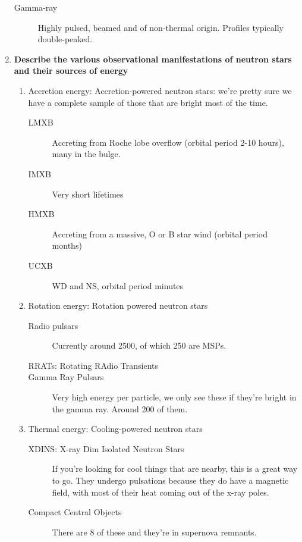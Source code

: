 \documentclass[a4paper]{article}
\begin{document}
\begin{enumerate}
\begin{description}
\item[Gamma-ray] Highly pulsed, beamed and of non-thermal origin. Profiles typically double-peaked. 

\end{description}

\item \textbf{Describe the various observational manifestations of neutron stars and their sources of energy}

\begin{enumerate}

\item Accretion energy: Accretion-powered neutron stars: we're pretty sure we have a complete sample of those that are bright most of the time. 
\begin{description}
\item[LMXB] Accreting from Roche lobe overflow (orbital period 2-10 hours), many in the bulge.
\item[IMXB] Very short lifetimes
\item[HMXB] Accreting from a massive, O or B star wind (orbital period months)
\item[UCXB] WD and NS, orbital period minutes
\end{description}

\item Rotation energy: Rotation powered neutron stars

\begin{description}
\item[Radio pulsars] Currently around 2500, of which 250 are MSPs. 
\item[RRATs: Rotating RAdio Transients] 
\item[Gamma Ray Pulsars] Very high energy per particle, we only see these if they're bright in the gamma ray. Around 200 of them. 
\end{description}

\item Thermal energy: Cooling-powered neutron stars

\begin{description}
\item[XDINS: X-ray Dim Isolated Neutron Stars] If you're looking for cool things that are nearby, this is a great way to go. They undergo pulsations because they do have a magnetic field, with most of their heat coming out of the x-ray poles.  
\item[Compact Central Objects] There are 8 of these and they're in supernova remnants. 
\end{description}


\end{enumerate}
\end{enumerate}
\end{document}
